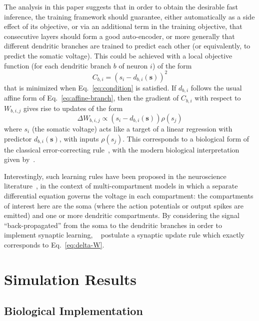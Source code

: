 \documentclass{article}
\newcommand   \vs{{\bm s}}
\begin{document}
The analysis in this paper suggests that in order to obtain the desirable
fast inference, the training framework should guarantee, either automatically
as a side effect of its objective, or via an additional term in the training objective,
that consecutive layers should form a good auto-encoder, or more generally that
different dendritic branches are trained to predict each other (or equivalently,
to predict the somatic voltage). This could be achieved with a local
objective function (for each dendritic branch $b$ of neuron $i$) of the form
\begin{equation}
     C_{b,i} = (s_i - d_{b,i}(\vs))^2
\end{equation}
that is minimized when Eq.~\ref{eq:condition} is satisfied. If $d_{b,i}$
follows the usual affine form of Eq.~\ref{eq:affine-branch}, then
the gradient of $C_{b,i}$ with respect to $W_{b,i,j}$ gives rise
to updates of the form
\begin{equation}
  \label{eq:delta-W}
   \Delta W_{b,i,j} \propto (s_i - d_{b,i}(\vs)) \rho(s_j)
\end{equation}
where $s_i$ (the somatic voltage) acts like a target of a linear
regression with predictor $d_{b,i}(\vs)$, with inputs $\rho(s_j)$.
This corresponds to a biological form of the classical error-correcting
rule~\citep{Widrow62}, with the modern biological interpretation
given by~\citet{Urb+Sn-2014}.

Interestingly, such learning rules have been proposed in the
neuroscience literature~\citep{Urbanczik+Senn-2014}, in the
context of multi-compartment models in which a separate
differential equation governs the voltage in each compartment:
the compartments of interest here are the soma (where the action
potentials or output spikes are emitted) and one or more dendritic
compartments. By considering the signal ``back-propagated'' from
the soma to the dendritic branches in order to implement synaptic
learning, ~\citet{Urbanczik+Senn-2014} postulate a synaptic
update rule which exactly corresponds to Eq.~\ref{eq:delta-W}.



\section{Simulation Results}

\iffalse
\subsection{Biological Implementation}
\end{document}
